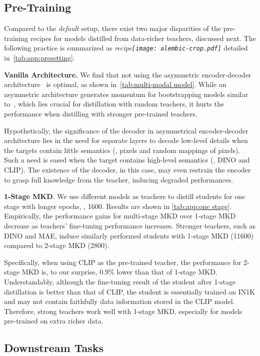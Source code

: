 \documentclass[10pt,twocolumn,letterpaper]{article}
\def \alambic {\texttt{[image: alembic-crop.pdf]}\xspace}
\begin{document}
\subsection{Pre-Training}
Compared to the \textit{default} setup, there exist two major disparities of the pre-training recipes for models distilled from data-richer teachers, discussed next. The following practice is summarized as \textit{recipe\alambic} detailed in~\cref{tab:app:presetting}. 

\noindent\textbf{Vanilla Architecture.} We find that not using the asymmetric encoder-decoder architecture~\cite{mae} is optimal, as shown in~\cref{tab:multi-modal model}. While an asymmetric architecture generates momentum for bootstrapping models similar to~\cite{byol}, which lies crucial for distillation with random teachers, it hurts the performance when distilling with stronger pre-trained teachers. 

Hypothetically, the significance of the decoder in asymmetrical encoder-decoder architecture lies in the need for separate layers to decode low-level details when the targets contain little semantics (\eg, pixels and random mappings of pixels). 
Such a need is eased when the target contains high-level semantics (\eg, DINO and CLIP). The existence of the decoder, in this case, may even restrain the encoder to grasp full knowledge from the teacher, inducing degraded performances.

\noindent\textbf{1-Stage MKD}. 
We use different models as teachers to distill students for one stage with longer epochs, \ie, 1600. Results are shown in \cref{tab:app:one stage}.
Empirically, the performance gains for multi-stage MKD over 1-stage MKD decrease as teachers' fine-tuning performance increases. Stronger teachers, such as DINO and MAE, induce similarly performed students with 1-stage MKD (11600) compared to 2-stage MKD (2800). 

Specifically, when using CLIP as the pre-trained teacher, the performance for 2-stage MKD is, to our surprise, 0.9\% lower than that of 1-stage MKD. Understandably, although the fine-tuning result of the student after 1-stage distillation is better than that of CLIP, the student is essentially trained on IN1K and may not contain faithfully data information stored in the CLIP model. Therefore, strong teachers work well with 1-stage MKD, especially for models pre-trained on extra richer data.

\subsection{Downstream Tasks}
\end{document}
